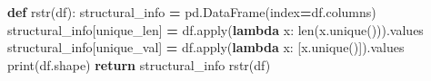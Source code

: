 \documentclass[
]{article}
\newenvironment{Shaded}{\begin{snugshade}}{\end{snugshade}}
\newcommand{\BuiltInTok}[1]{#1}
\newcommand{\ControlFlowTok}[1]{\textcolor[rgb]{0.13,0.29,0.53}{\textbf{#1}}}
\newcommand{\KeywordTok}[1]{\textcolor[rgb]{0.13,0.29,0.53}{\textbf{#1}}}
\newcommand{\NormalTok}[1]{#1}
\newcommand{\OperatorTok}[1]{\textcolor[rgb]{0.81,0.36,0.00}{\textbf{#1}}}
\newcommand{\StringTok}[1]{\textcolor[rgb]{0.31,0.60,0.02}{#1}}
\begin{document}
\begin{Shaded}
\begin{Highlighting}[]
\KeywordTok{def}\NormalTok{ rstr(df): }
\NormalTok{    structural\_info }\OperatorTok{=}\NormalTok{ pd.DataFrame(index}\OperatorTok{=}\NormalTok{df.columns)}
\NormalTok{    structural\_info[}\StringTok{\textquotesingle{}unique\_len\textquotesingle{}}\NormalTok{] }\OperatorTok{=}\NormalTok{ df.}\BuiltInTok{apply}\NormalTok{(}\KeywordTok{lambda}\NormalTok{ x: }\BuiltInTok{len}\NormalTok{(x.unique())).values}
\NormalTok{    structural\_info[}\StringTok{\textquotesingle{}unique\_val\textquotesingle{}}\NormalTok{] }\OperatorTok{=}\NormalTok{ df.}\BuiltInTok{apply}\NormalTok{(}\KeywordTok{lambda}\NormalTok{ x: [x.unique()]).values}
    \BuiltInTok{print}\NormalTok{(df.shape)}
    \ControlFlowTok{return}\NormalTok{ structural\_info  }
\NormalTok{rstr(df)}
\end{Highlighting}
\end{Shaded}

\pagebreak
\end{document}
